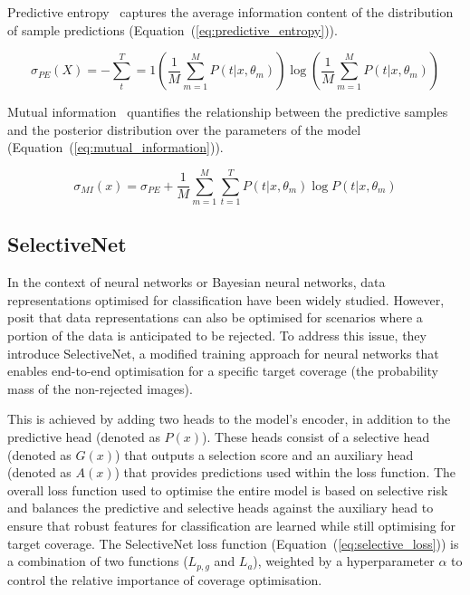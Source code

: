 \noindent Predictive entropy~\citep{shannon1948mathematical} captures the average information content of the distribution of sample predictions (Equation~(\ref{eq:predictive_entropy})).
   
\begin{equation}
	\sigma_{PE}(X)=-\sum^T_t=1\left(\frac{1}{M}\sum^M_{m=1}P(t|x,\theta_m)\right)\log\left(\frac{1}{M}\sum^M_{m=1}P(t|x,\theta_m)\right)
	\label{eq:predictive_entropy}
\end{equation}

\noindent Mutual information~\citep{houlsby2011bayesian} quantifies the relationship between the predictive samples and the posterior distribution over the parameters of the model (Equation~(\ref{eq:mutual_information})).

\begin{equation}
	\sigma_{MI}(x) = \sigma_{PE} + \frac{1}{M}\sum^M_{m=1}\sum^T_{t=1}P(t|x,\theta_m)\log P(t|x,\theta_m)
	\label{eq:mutual_information}
\end{equation}

\subsection{SelectiveNet}
\label{subsec:selectivenet}
In the context of neural networks or Bayesian neural networks, data representations optimised for classification have been widely studied. However, \cite{geifman2019selectivenet} posit that data representations can also be optimised for scenarios where a portion of the data is anticipated to be rejected. To address this issue, they introduce SelectiveNet, a modified training approach for neural networks that enables end-to-end optimisation for a specific target coverage (the probability mass of the non-rejected images).

This is achieved by adding two heads to the model's encoder, in addition to the predictive head (denoted as $P(x)$). These heads consist of a selective head (denoted as $G(x)$) that outputs a selection score and an auxiliary head (denoted as $A(x)$) that provides predictions used within the loss function. The overall loss function used to optimise the entire model is based on selective risk and balances the predictive and selective heads against the auxiliary head to ensure that robust features for classification are learned while still optimising for target coverage. The SelectiveNet loss function (Equation~(\ref{eq:selective_loss})) is a combination of two functions ($L_{p,g}$ and $L_a$), weighted by a hyperparameter $\alpha$ to control the relative importance of coverage optimisation.

